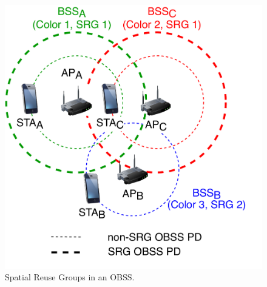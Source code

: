 \documentclass{ieeeaccess}
\begin{document}
\begin{figure}[ht!]
	\centering
	\includegraphics[width=0.7\columnwidth]{fig_6}
	\caption{Spatial Reuse Groups in an OBSS.}
	\label{fig:fig_6}
\end{figure}
\end{document}
